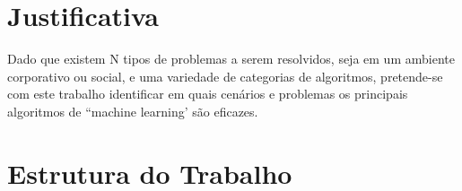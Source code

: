 \section{Justificativa}
\label{sec:justificativa}

Dado que existem N tipos de problemas a serem resolvidos, seja em um ambiente corporativo ou social, e uma variedade de categorias de algoritmos, pretende-se com este trabalho identificar em quais cenários e problemas os principais algoritmos de “machine learning’ são eficazes.

\section{Estrutura do Trabalho}
\label{sec:estrutura-trabalho}
